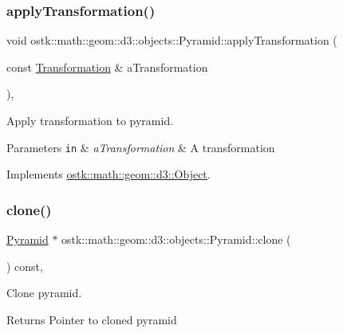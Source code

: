 \subsubsection{\texorpdfstring{apply\+Transformation()}{applyTransformation()}}
{\footnotesize\ttfamily void ostk\+::math\+::geom\+::d3\+::objects\+::\+Pyramid\+::apply\+Transformation (\begin{DoxyParamCaption}\item[{const \hyperlink{classostk_1_1math_1_1geom_1_1d3_1_1_transformation}{Transformation} \&}]{a\+Transformation }\end{DoxyParamCaption})\hspace{0.3cm}{\ttfamily [override]}, {\ttfamily [virtual]}}



Apply transformation to pyramid. 


\begin{DoxyParams}[1]{Parameters}
\mbox{\tt in}  & {\em a\+Transformation} & A transformation \\
\hline
\end{DoxyParams}


Implements \hyperlink{classostk_1_1math_1_1geom_1_1d3_1_1_object_ae9194dd6d2bb4df09292ffc84dccdb1d}{ostk\+::math\+::geom\+::d3\+::\+Object}.

\mbox{\label{classostk_1_1math_1_1geom_1_1d3_1_1objects_1_1_pyramid_aefdaacc9298ef9d9a26137b2976f7dc6}} 
\subsubsection{\texorpdfstring{clone()}{clone()}}
{\footnotesize\ttfamily \hyperlink{classostk_1_1math_1_1geom_1_1d3_1_1objects_1_1_pyramid}{Pyramid} $\ast$ ostk\+::math\+::geom\+::d3\+::objects\+::\+Pyramid\+::clone (\begin{DoxyParamCaption}{ }\end{DoxyParamCaption}) const\hspace{0.3cm}{\ttfamily [override]}, {\ttfamily [virtual]}}



Clone pyramid. 

\begin{DoxyReturn}{Returns}
Pointer to cloned pyramid 
\end{DoxyReturn}


